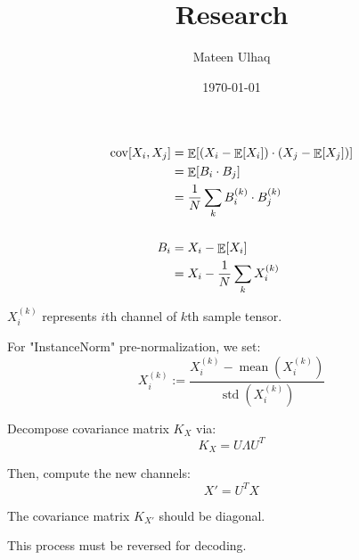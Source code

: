 \documentclass[12pt]{extarticle}
\title{Research}
\author{Mateen Ulhaq}
\date{\today}
\DeclareMathOperator{\cov}{cov}
\DeclareMathOperator{\EV}{\mathbb{E}}
\DeclareMathOperator{\mean}{mean}
\DeclareMathOperator{\std}{std}
\begin{document}
\maketitle

\begin{align*}
  \cov[X_i, X_j]
    &= \EV[(X_i - \EV[X_i]) \cdot (X_j - \EV[X_j])] \\
    &= \EV[B_i \cdot B_j] \\
    &= \frac{1}{N} \sum_k {B_i^{(k)} \cdot B_j^{(k)}} \\[\baselineskip]
  B_i
    &= X_i - \EV[X_i] \\
    &= X_i - \frac{1}{N} \sum_k X_i^{(k)}
\end{align*}

$X_i^{(k)}$ represents $i$th channel of $k$th sample tensor.

\bigskip

For "InstanceNorm" pre-normalization, we set:
\[ X_i^{(k)} := \frac{X_i^{(k)} - \mean(X_i^{(k)})}{\std(X_i^{(k)})} \]

\bigskip

Decompose covariance matrix $K_X$ via:
\[ K_X = U \Lambda U^T \]

Then, compute the new channels:
\[ X' = U^T X \]

The covariance matrix $K_{X'}$ should be diagonal.

\bigskip
This process must be reversed for decoding.
\end{document}
